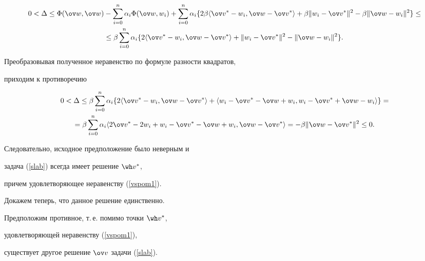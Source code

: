 \begin{pf}
\begin{multline*}
0<\Delta\le \Phi(\ov w,\ov w) - \sum_{i=0}^n \alpha_i


\Phi(\ov w,w_i) + \sum_{i=0}^n \alpha_i


\{2 \beta \langle \ov v^* - w_i, \ov w-\ov v^*\rangle +


\beta \|w_i - \ov v^*\|^2 -


\beta \|\ov w - w_i\|^2\}\leq \\ \le


\beta \sum_{i=0}^n \alpha_i


\{ 2 \langle \ov v^* - w_i, \ov w-\ov v^*\rangle +


\|w_i - \ov v^*\|^2 -


\|\ov w - w_i\|^2\}.


\end{multline*}


Преобразовывая полученное неравенство по формуле разности квадратов,


приходим к противоречию


\begin{multline*}


0< \Delta\leq \beta \sum_{i=0}^n \alpha_i


\{ 2 \langle \ov v^* - w_i, \ov w-\ov v^*\rangle+


\langle w_i - \ov v^* - \ov w + w_i, w_i - \ov v^* + \ov w - w_i\rangle\} =\\


%


= \beta \sum_{i=0}^n \alpha_i \langle 2 \ov v^* -2 w_i + w_i - \ov v^* -


\ov w + w_i, \ov w - \ov v^*\rangle


= - \beta \|\ov w - \ov v^*\|^2\leq 0.


\end{multline*}


Следовательно, исходное предположение было неверным и


задача (\ref{slab}) всегда имеет решение $\wh v^*$,


причем удовлетворяющее неравенству (\ref{vspom1}).


Докажем теперь, что данное решение единственно.





Предположим противное, т.\,е. помимо точки $\wh v^*$, 


удовлетворяющей неравенству (\ref{vspom1}),


существует другое решение $\ov v$ задачи (\ref{slab}).






\end{pf}
